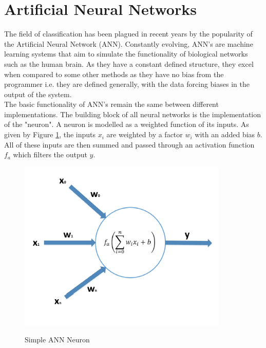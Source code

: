 \documentclass[11pt]{article}
\begin{document}
	\noindent
	
	
	\section{Artificial Neural Networks}
	The field of classification has been plagued in recent years by the popularity of the Artificial Neural Network (ANN). Constantly evolving, ANN's are machine learning systems that aim to simulate the functionality of biological networks such as the human brain. As they have a constant defined structure, they excel when compared to some other methods as they have no bias from the programmer i.e. they are defined generally, with the data forcing biases in the output of the system.\\
	
	\noindent
	The basic functionality of ANN's remain the same between different implementations. The building block of all neural networks is the implementation of the "neuron". A neuron is modelled as a weighted function of its inputs. As given by Figure \ref{fig:neuron}, the inputs $x_i$ are weighted by a factor $w_i$ with an added bias $b$. All of these inputs are then summed and passed through an activation function $f_a$ which filters the output $y$.\\
	
	\begin{figure}[H]
		\centering
		\includegraphics[width=10cm]{Figures/neuron}
		\caption{Simple ANN Neuron}\cite{Bonaccorso2017}
		\label{fig:neuron}
	\end{figure}
\end{document}
